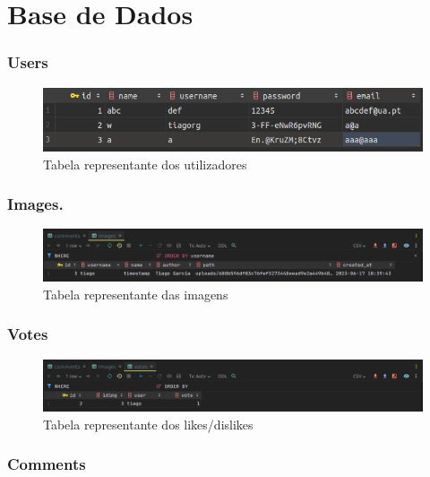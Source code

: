 \documentclass{report}
\begin{document}
\section{Base de Dados}

\subsubsection{Users}

\begin{figure}[H]
    \centering
    \includegraphics[scale=0.2]{../images/users}
    \caption{Tabela representante dos utilizadores}
    \label{fig:users}
\end{figure}

\subsubsection{Images.}

\begin{figure}[H]
    \centering
    \includegraphics[scale=0.2]{../images/images}
    \caption{Tabela representante das imagens}
    \label{fig:images}
\end{figure}

\subsubsection{Votes}

\begin{figure}[H]
    \centering
    \includegraphics[scale=0.2]{../images/votes}
    \caption{Tabela representante dos likes/dislikes}
    \label{fig:votes}
\end{figure}

\subsubsection{Comments}
\end{document}
